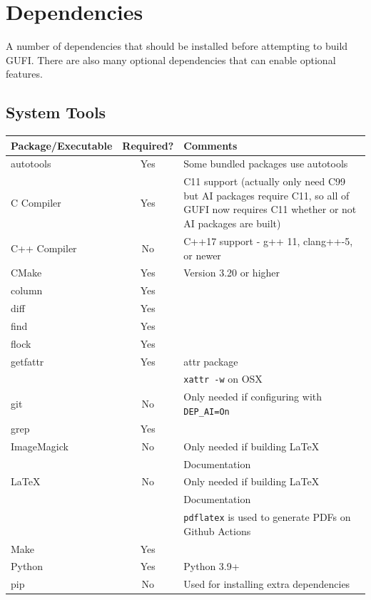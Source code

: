 \section{Dependencies}
A number of dependencies that should be installed before attempting to
build GUFI. There are also many optional dependencies that can enable
optional features.

\subsection{System Tools}
\begin{center}
\begin{tabularx}{\textwidth}{| l | c | X | }
  \hline
  Package/Executable & Required? & Comments \\
  \hline
  autotools & Yes & Some bundled packages use autotools \\
  \hline
  C Compiler & Yes & C11 support (actually only need C99 but AI
  packages require C11, so all of GUFI now requires C11 whether or not
  AI packages are built) \\
  \hline
  C++ Compiler & No & C++17 support - g++ 11, clang++-5, or newer
  \hfill \\
  \hline
  CMake & Yes & Version 3.20 or higher \\
  \hline
  column & Yes & \\
  \hline
  diff & Yes & \\
  \hline
  find & Yes & \\
  \hline
  flock & Yes & \\
  \hline
  getfattr & Yes & attr package \\
  & & \texttt{xattr -w} on OSX \\
  \hline
  git & No & Only needed if configuring with \texttt{DEP\_AI=On} \\
  \hline
  grep & Yes & \\
  \hline
  ImageMagick & No & Only needed if building \LaTeX \hfill \\
  & & Documentation \hfill \\
  \hline
  \LaTeX & No & Only needed if building \LaTeX \hfill \\
  & & Documentation \hfill \\
  & & \texttt{pdflatex} is used to generate PDFs on Github Actions \hfill \\
  \hline
  Make & Yes & \\
  \hline
  Python & Yes & Python 3.9+ \\
  \hline
  pip & No & Used for installing extra dependencies \\

\end{tabularx}
\end{center}

